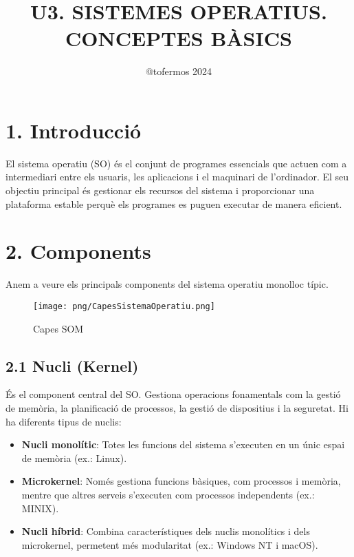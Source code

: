 \documentclass[
  a4paper,
]{article}
\title{U3. SISTEMES OPERATIUS. CONCEPTES BÀSICS}
\author{@tofermos 2024}
\date{}
\begin{document}
\maketitle

{
\setcounter{tocdepth}{2}
\tableofcontents
}
\newpage
\renewcommand\tablename{Tabla}

\section{1. Introducció}\label{introducciuxf3}

El sistema operatiu (SO) és el conjunt de programes essencials que
actuen com a intermediari entre els usuaris, les aplicacions i el
maquinari de l'ordinador. El seu objectiu principal és gestionar els
recursos del sistema i proporcionar una plataforma estable perquè els
programes es puguen executar de manera eficient.

\section{2. Components}\label{components}

Anem a veure els principals components del sistema operatiu monolloc
típic.

\begin{figure}
\centering
\texttt{[image: png/CapesSistemaOperatiu.png]}
\caption{Capes SOM}
\end{figure}

\subsection{2.1 Nucli (Kernel)}\label{nucli-kernel}

És el component central del SO. Gestiona operacions fonamentals com la
gestió de memòria, la planificació de processos, la gestió de
dispositius i la seguretat. Hi ha diferents tipus de nuclis:

\begin{itemize}
\item
  \textbf{Nucli monolític}: Totes les funcions del sistema s'executen en
  un únic espai de memòria (ex.: Linux).
\item
  \textbf{Microkernel}: Només gestiona funcions bàsiques, com processos
  i memòria, mentre que altres serveis s'executen com processos
  independents (ex.: MINIX).
\item
  \textbf{Nucli híbrid}: Combina característiques dels nuclis monolítics
  i dels microkernel, permetent més modularitat (ex.: Windows NT i
  macOS).
\end{itemize}
\end{document}
